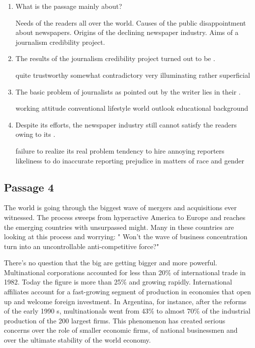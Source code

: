 \begin{enumerate}[resume]
	\item
What is the passage mainly about?


\fourchoices
{Needs of the readers all over the world.}
{Causes of the public disappointment about newspapers.}
{Origins of the declining newspaper industry.}
{Aims of a journalism credibility project.}



\item
The results of the journalism credibility project turned out to be \lineread.


\fourchoices
{quite trustworthy}
{somewhat contradictory}
{very illuminating}
{rather superficial}


\item
The basic problem of journalists as pointed out by the writer lies
in their \lineread.


\fourchoices
{working attitude}
{conventional lifestyle}
{world outlook}
{educational background}


\item
Despite its efforts, the newspaper industry still cannot satisfy the
readers owing to its \lineread.


\fourchoices
{failure to realize its real problem}
{tendency to hire annoying reporters}
{likeliness to do inaccurate reporting}
{prejudice in matters of race and gender}


\end{enumerate}


\newpage
\subsection{Passage 4}

The world is going through the biggest wave of mergers and acquisitions
ever witnessed. The process sweeps from hyperactive America to Europe
and reaches the emerging countries with unsurpassed might. Many in these
countries are looking at this process and worrying: " Won't the wave of
business concentration turn into an uncontrollable anti-competitive
force?"

There's no question that the big are getting bigger and more powerful.
Multinational corporations accounted for less than 20\% of international
trade in 1982. Today the figure is more than 25\% and growing rapidly.
International affiliates account for a fast-growing segment of
production in economies that open up and welcome foreign investment. In
Argentina, for instance, after the reforms of the early 1990 s,
multinationals went from 43\% to almost 70\% of the industrial
production of the 200 largest firms. This phenomenon has created serious
concerns over the role of smaller economic firms, of national
businessmen and over the ultimate stability of the world economy.

